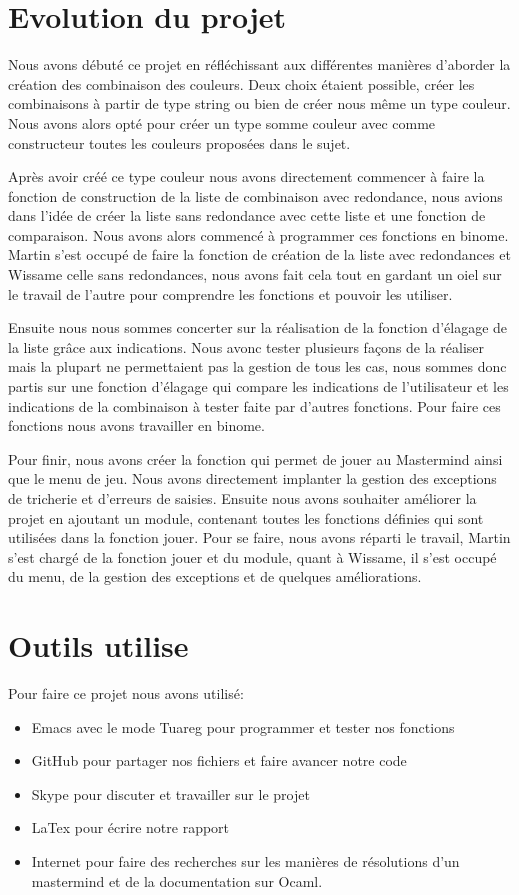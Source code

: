 \documentclass[a4paper,twoside,12pt]{report}
\begin{document}
\section{Evolution du projet}
% 
\par
Nous avons débuté ce projet en réfléchissant aux différentes manières d'aborder la création des combinaison des couleurs. Deux choix étaient possible, créer les combinaisons à partir de type string ou bien de créer nous même un type couleur. Nous avons alors opté pour créer un type somme couleur avec comme constructeur toutes les couleurs proposées dans le sujet. 
\par
Après avoir créé ce type couleur nous avons directement commencer à faire la fonction de construction de la liste de combinaison avec redondance, nous avions dans l'idée de créer la liste sans redondance avec cette liste et une fonction de comparaison. Nous avons alors commencé à programmer ces fonctions en binome. Martin s'est occupé de faire la fonction de création de la liste avec redondances et Wissame celle sans redondances, nous avons fait cela tout en gardant un oiel sur le travail de l'autre pour comprendre les fonctions et pouvoir les utiliser.
\par 
Ensuite nous nous sommes concerter sur la réalisation de la fonction d'élagage de la liste grâce aux indications. Nous avonc tester plusieurs façons de la réaliser mais la plupart ne permettaient pas la gestion de tous les cas, nous sommes donc partis sur une fonction d'élagage qui compare les indications de l'utilisateur et les indications de la combinaison à tester faite par d'autres fonctions. Pour faire ces fonctions nous avons travailler en binome.
\par
Pour finir, nous avons créer la fonction qui permet de jouer au Mastermind ainsi que le menu de jeu. Nous avons directement implanter la gestion des exceptions de tricherie et d'erreurs de saisies. Ensuite nous avons souhaiter améliorer la projet en ajoutant un module, contenant toutes les fonctions définies qui sont utilisées dans la fonction jouer. Pour se faire, nous avons réparti le travail, Martin s'est chargé de la fonction jouer et du module, quant à Wissame, il s'est occupé du menu, de la gestion des exceptions et de quelques améliorations.
\section{Outils utilise}
% 
Pour faire ce projet nous avons utilisé:
\begin{itemize}
\item Emacs avec le mode Tuareg pour programmer et tester nos fonctions
\item GitHub pour partager nos fichiers et faire avancer notre code
\item Skype pour discuter et travailler sur le projet
\item LaTex pour écrire notre rapport
\item Internet pour faire des recherches sur les manières de résolutions d'un mastermind et de la documentation sur Ocaml.
\end{itemize}
\end{document}
